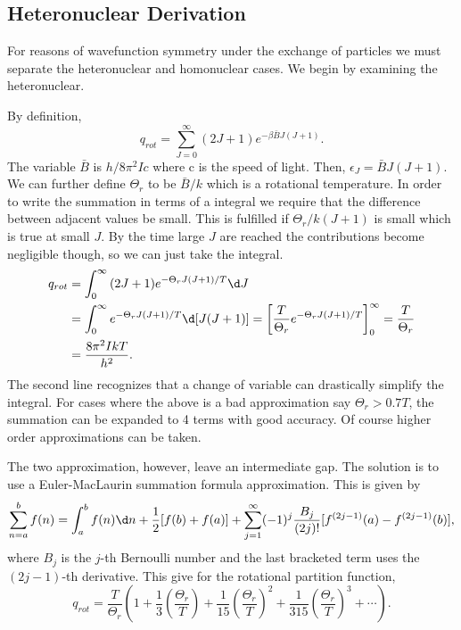 \subsection{Heteronuclear Derivation}
For reasons of wavefunction symmetry under the exchange of particles we must
separate the heteronuclear and homonuclear cases. We begin by examining the
heteronuclear.

By definition,
\begin{equation*}
	q_{rot} = \sum_{J=0}^{\infty}{(2J+1)e^{-\beta\bar{B}J(J+1)}}.
\end{equation*}
The variable $\bar{B}$ is $h/8\pi^2 Ic$ where c is the speed of light. Then,
$\epsilon_J = \bar{B}J(J+1)$. We can further define $\Theta_r$ to be $\bar{B}/k$
which is a rotational temperature. In order to write the summation in terms of a
integral we require that the difference between adjacent values be small. This
is fulfilled if $\Theta_r / k (J+1)$ is small which is true at small $J$. By the
time large $J$ are reached the contributions become negligible though, so we can
just take the integral.
\begin{align*}
	q_{rot} &= \int_0^{\infty}{(2J+1) e^{-\Theta_r J(J+1)/T} \d J}\\
			&= \int_0^{\infty}{e^{-\Theta_r J(J+1)/T} \d [J(J+1)]} = \left[
			\frac{T}{\Theta_r} e^{-\Theta_r J(J+1)/T}\right]_{0}^{\infty} =
			\frac{T}{\Theta_r}\\
			&= \frac{8\pi^2 IkT}{h^{2}}. 
\end{align*}
The second line recognizes that a change of variable can drastically simplify
the integral. For cases where the above is a bad approximation say $\Theta_r >
0.7T$, the summation can be expanded to 4 terms with good accuracy. Of course
higher order approximations can be taken.

The two approximation, however, leave an intermediate gap. The solution is to
use a Euler-MacLaurin summation formula approximation. This is given by
\begin{equation*}
	\sum_{n=a}^{b}{f(n)} = \int_{a}^{b}{f(n)\d n} + \frac{1}{2} [f(b)+f(a)] +
			\sum_{j=1}^{\infty}(-1)^{j}\frac{B_j}{(2j)!}[f^{(2j-1)}(a) -
			f^{(2j-1)}(b)],
\end{equation*}
where $B_j$ is the $j$-th Bernoulli number and the last bracketed term uses the
$(2j-1)$-th derivative. This give for the rotational partition function,
\begin{equation*}
	q_{rot} = \frac{T}{\Theta_r} \left( 1 +
		\frac{1}{3}\left(\frac{\Theta_r}{T}\right) +
		\frac{1}{15}\left(\frac{\Theta_r}{T}\right)^2 +
	\frac{1}{315}\left(\frac{\Theta_r}{T}\right)^3 + \cdots\right).
\end{equation*}

